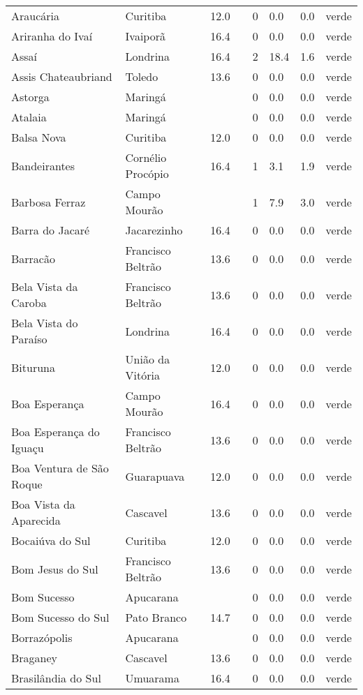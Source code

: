 \begin{longtable}{l|lllllll}
  Araucária & Curitiba & 12.0 &  & 0 & 0.0 & 0.0 & verde \\ 
  Ariranha do Ivaí & Ivaiporã & 16.4 &  & 0 & 0.0 & 0.0 & verde \\ 
  Assaí & Londrina & 16.4 &  & 2 & 18.4 & 1.6 & verde \\ 
  Assis Chateaubriand & Toledo & 13.6 &  & 0 & 0.0 & 0.0 & verde \\ 
  Astorga & Maringá &  &  & 0 & 0.0 & 0.0 & verde \\ 
  Atalaia & Maringá &  &  & 0 & 0.0 & 0.0 & verde \\ 
  Balsa Nova & Curitiba & 12.0 &  & 0 & 0.0 & 0.0 & verde \\ 
  Bandeirantes & Cornélio Procópio & 16.4 &  & 1 & 3.1 & 1.9 & verde \\ 
  Barbosa Ferraz & Campo Mourão &  &  & 1 & 7.9 & 3.0 & verde \\ 
  Barra do Jacaré & Jacarezinho & 16.4 &  & 0 & 0.0 & 0.0 & verde \\ 
  Barracão & Francisco Beltrão & 13.6 &  & 0 & 0.0 & 0.0 & verde \\ 
  Bela Vista da Caroba & Francisco Beltrão & 13.6 &  & 0 & 0.0 & 0.0 & verde \\ 
  Bela Vista do Paraíso & Londrina & 16.4 &  & 0 & 0.0 & 0.0 & verde \\ 
  Bituruna & União da Vitória & 12.0 &  & 0 & 0.0 & 0.0 & verde \\ 
  Boa Esperança & Campo Mourão & 16.4 &  & 0 & 0.0 & 0.0 & verde \\ 
  Boa Esperança do Iguaçu & Francisco Beltrão & 13.6 &  & 0 & 0.0 & 0.0 & verde \\ 
  Boa Ventura de São Roque & Guarapuava & 12.0 &  & 0 & 0.0 & 0.0 & verde \\ 
  Boa Vista da Aparecida & Cascavel & 13.6 &  & 0 & 0.0 & 0.0 & verde \\ 
  Bocaiúva do Sul & Curitiba & 12.0 &  & 0 & 0.0 & 0.0 & verde \\ 
  Bom Jesus do Sul & Francisco Beltrão & 13.6 &  & 0 & 0.0 & 0.0 & verde \\ 
  Bom Sucesso & Apucarana &  &  & 0 & 0.0 & 0.0 & verde \\ 
  Bom Sucesso do Sul & Pato Branco & 14.7 &  & 0 & 0.0 & 0.0 & verde \\ 
  Borrazópolis & Apucarana &  &  & 0 & 0.0 & 0.0 & verde \\ 
  Braganey & Cascavel & 13.6 &  & 0 & 0.0 & 0.0 & verde \\ 
  Brasilândia do Sul & Umuarama & 16.4 &  & 0 & 0.0 & 0.0 & verde \\ 

\end{longtable}
